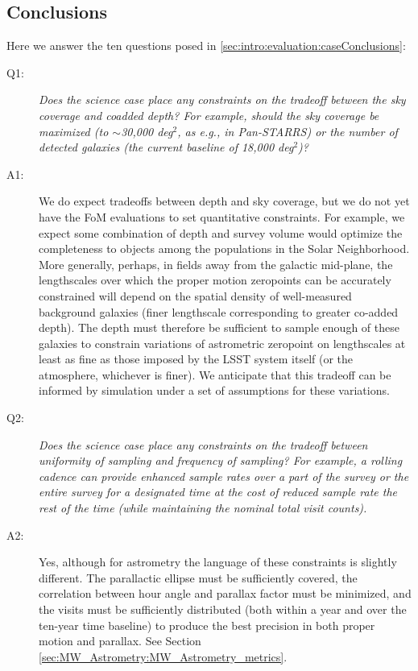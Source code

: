 
\subsection{Conclusions}

Here we answer the ten questions posed in
\autoref{sec:intro:evaluation:caseConclusions}:

\begin{description}

\item[Q1:] {\it Does the science case place any constraints on the
tradeoff between the sky coverage and coadded depth? For example, should
the sky coverage be maximized (to $\sim$30,000 deg$^2$, as e.g., in
Pan-STARRS) or the number of detected galaxies (the current baseline
of 18,000 deg$^2$)?}

\item[A1:] We do expect tradeoffs between depth and sky
  coverage, but we do not yet have the FoM evaluations to set
  quantitative constraints. For example, we expect some combination of
  depth and survey volume would optimize the completeness to objects
  among the populations in the Solar Neighborhood. More generally,
  perhaps, in fields away from the galactic mid-plane, the
  lengthscales over which the proper motion zeropoints can be
  accurately constrained will depend on the spatial density of
  well-measured background galaxies (finer lengthscale corresponding
  to greater co-added depth). The depth must therefore be sufficient
  to sample enough of these galaxies to constrain variations of
  astrometric zeropoint on lengthscales at least as fine as those
  imposed by the LSST system itself (or the atmosphere, whichever is
  finer). We anticipate that this tradeoff can be informed by
  simulation under a set of assumptions for these variations.

\item[Q2:] {\it Does the science case place any constraints on the
tradeoff between uniformity of sampling and frequency of  sampling? For
example, a rolling cadence can provide enhanced sample rates over a part
of the survey or the entire survey for a designated time at the cost of
reduced sample rate the rest of the time (while maintaining the nominal
total visit counts).}

\item[A2:] Yes, although for astrometry the language of these
  constraints is slightly different. The parallactic ellipse must be
  sufficiently covered, the correlation between hour angle and
  parallax factor must be minimized, and the visits must be
  sufficiently distributed (both within a year and over the ten-year
  time baseline) to produce the best precision in both proper motion and parallax. See Section \ref{sec:MW_Astrometry:MW_Astrometry_metrics}.


\end{description}
